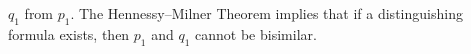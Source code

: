 \begin{isabellebody}
\begin{isamarkuptext}
$q_1$ from $p_1$. The Hennessy--Milner Theorem implies that if a distinguishing formula exists, then $p_1$ and $q_1$ cannot be bisimilar.%
\end{isamarkuptext}\isamarkuptrue%
\isamarkupfalse%
\ %
\isanewline
%
\isadelimvisible
%
\endisadelimvisible
%
\isatagvisible
%
\endisatagvisible
{\isafoldvisible}%
%
\isadelimvisible
%
\endisadelimvisible
%
\isadelimdocument
%
\endisadelimdocument
%
\isatagdocument
%
\endisatagdocument
{\isafolddocument}%
%
\isadelimdocument
%
\endisadelimdocument
%
\isadelimvisible
%
\endisadelimvisible
%
\isatagvisible
%
\endisatagvisible
{\isafoldvisible}%
%
\isadelimvisible
%
\endisadelimvisible
%
\isadelimtheory
%
\endisadelimtheory
%
\isatagtheory
%
\endisatagtheory
{\isafoldtheory}%
%
\isadelimtheory
%
\endisadelimtheory
%
\end{isabellebody}%
\endinput
